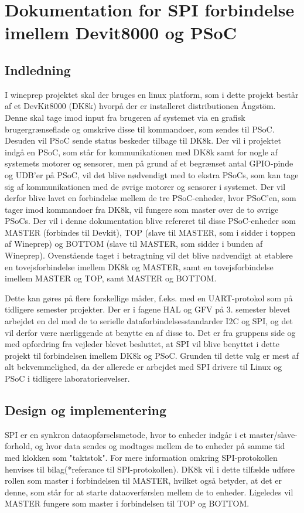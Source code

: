 \chapter{Dokumentation for SPI forbindelse imellem Devit8000 og PSoC}

\section{Indledning}
I wineprep projektet skal der bruges en linux platform, som i dette projekt består af et DevKit8000 (DK8k) hvorpå der er installeret distributionen Ångstöm. 
Denne skal tage imod input fra brugeren af systemet via en grafisk brugergrænseflade og omskrive disse til kommandoer, som sendes til PSoC. Desuden
vil PSoC sende status beskeder tilbage til DK8k.
Der vil i projektet indgå en PSoC, som står for kommunikationen med DK8k samt for nogle af systemets motorer og sensorer,
men på grund af et begrænset antal GPIO-pinde og UDB'er på PSoC, vil det blive nødvendigt med to ekstra PSoCs, som kan tage sig af kommunikationen med de 
øvrige motorer og sensorer i systemet. Der vil derfor blive lavet en forbindelse mellem de tre PSoC-enheder, hvor PSoC'en, som tager imod kommandoer fra
DK8k, vil fungere som master over de to øvrige PSoCs. Der vil i denne dokumentation blive refereret til disse PSoC-enheder som MASTER
(forbindes til Devkit), TOP (slave til MASTER, som i sidder i toppen af Wineprep) og BOTTOM (slave til MASTER, som sidder i bunden af
Wineprep).
Ovenstående taget i betragtning vil det blive nødvendigt at etablere en tovejsforbindelse imellem DK8k og MASTER, samt en tovejsforbindelse imellem 
MASTER og TOP, samt MASTER og BOTTOM. 

Dette kan gøres på flere forskellige måder, f.eks. med en UART-protokol som på tidligere semester projekter. Der er i fagene HAL og GFV på 3. semester 
blevet arbejdet en del med de to serielle dataforbindelsesstandarder I2C og SPI, og det vil derfor være nærliggende at benytte en af disse to. 
Det er fra gruppens side og med opfordring fra vejleder blevet besluttet, at SPI vil blive benyttet i dette projekt til forbindelsen imellem DK8k og 
PSoC. Grunden til dette valg er mest af alt bekvemmelighed, da der allerede er arbejdet med SPI drivere til Linux og PSoC i tidligere laboratorieøvelser.   

\section{Design og implementering}
SPI er en synkron dataopførselsmetode, hvor to enheder indgår i et master/slave-forhold, og hvor data sendes og modtages mellem de to enheder på
samme tid med klokken som "taktstok". For mere information omkring SPI-protokollen henvises til bilag(*referance til SPI-protokollen).
DK8k vil i dette tilfælde udføre rollen som master i forbindelsen til MASTER, hvilket også betyder, at det er denne, som står for at starte 
dataoverførslen mellem de to enheder. Ligeledes vil MASTER fungere som master i forbindelsen til TOP og BOTTOM.

